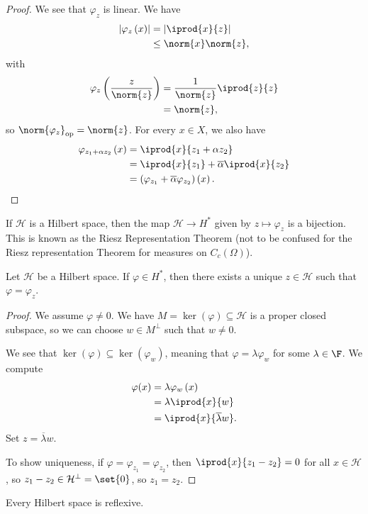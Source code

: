 \documentclass[10pt]{mypackage}
\begin{document}
\begin{proof}
  We see that $\varphi_z$ is linear. We have
  \begin{align*}
    \left\vert \varphi_z\left(x\right) \right\vert &= \left\vert \iprod{x}{z} \right\vert\\
                                                   &\leq \norm{x}\norm{z},
  \end{align*}
  with
  \begin{align*}
    \varphi_z\left(\frac{z}{\norm{z}}\right) &= \frac{1}{\norm{z}} \iprod{z}{z}\\
                                             &= \norm{z},
  \end{align*}
  so $\norm{\varphi_z}_{\text{op}} = \norm{z}$. For every $x\in X$, we also have
  \begin{align*}
    \varphi_{z_1 + \alpha z_2} \left(x\right) &= \iprod{x}{z_1 + \alpha z_2}\\
                                              &= \iprod{x}{z_1} + \overline{\alpha} \iprod{x}{z_2}\\
                                              &= \left(\varphi_{z_1} + \overline{\alpha}\varphi_{z_2}\right) \left(x\right).
  \end{align*}
\end{proof}
If $\mathcal{H}$ is a Hilbert space, then the map $\mathcal{H}\rightarrow H^{\ast}$ given by $z\mapsto \varphi_z$ is a bijection. This is known as the Riesz Representation Theorem (not to be confused for the Riesz representation Theorem for measures on $C_c\left(\Omega\right)$).
\begin{theorem}
  Let $\mathcal{H}$ be a Hilbert space. If $\varphi\in H^{\ast}$, then there exists a unique $z\in \mathcal{H}$ such that $\varphi = \varphi_z$.
\end{theorem}
\begin{proof}
  We assume $\varphi\neq 0$. We have $M = \ker\left(\varphi\right)\subseteq \mathcal{H}$ is a proper closed subspace, so we can choose $w\in M^{\perp}$ such that $w\neq 0$.\newline

  We see that $\ker\left(\varphi\right)\subseteq \ker\left(\varphi_w\right)$, meaning that $\varphi = \lambda \varphi_w$ for some $\lambda\in \F$. We compute
  \begin{align*}
    \varphi(x) &= \lambda\varphi_w\left(x\right)\\
               &= \lambda \iprod{x}{w}\\
               &= \iprod{x}{\overline{\lambda}w}.
  \end{align*}
  Set $z = \overline{\lambda}w$.\newline

  To show uniqueness, if $\varphi = \varphi_{z_1} = \varphi_{z_2}$, then $ \iprod{x}{z_1 - z_2} = 0 $ for all $x\in \mathcal{H}$, so $z_1 - z_2 \in \mathcal{H}^{\perp} = \set{0}$, so $z_1 = z_2$.
\end{proof}
\begin{theorem}
  Every Hilbert space is reflexive.
\end{theorem}
\end{document}

